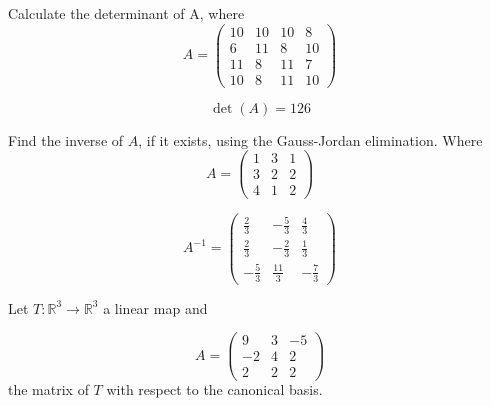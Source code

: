 \begin{questions}

\question Calculate the determinant of A, where
$$
A=\left(\begin{array}{rrrr}
10 & 10 & 10 & 8 \\
6 & 11 & 8 & 10 \\
11 & 8 & 11 & 7 \\
10 & 8 & 11 & 10
\end{array}\right)
$$

\begin{solution}
$$\det(A)=126$$
\end{solution}

\question Find the inverse of $A$, if it exists, using the Gauss-Jordan elimination. Where
$$
A=\left(\begin{array}{rrr}
1 & 3 & 1 \\
3 & 2 & 2 \\
4 & 1 & 2
\end{array}\right)
$$

\begin{solution}
$$A^{-1}=\left(\begin{array}{rrr}
\frac{2}{3} & -\frac{5}{3} & \frac{4}{3} \\
\frac{2}{3} & -\frac{2}{3} & \frac{1}{3} \\
-\frac{5}{3} & \frac{11}{3} & -\frac{7}{3}
\end{array}\right)$$
\end{solution}

\question Let $T:\mathbb{R}^3\rightarrow\mathbb{R}^3$  a linear map and
 
$$
A=\left(\begin{array}{rrr}
9 & 3 & -5 \\
-2 & 4 & 2 \\
2 & 2 & 2
\end{array}\right)
$$
the matrix of $T$ with respect to the canonical basis.
\end{questions}
